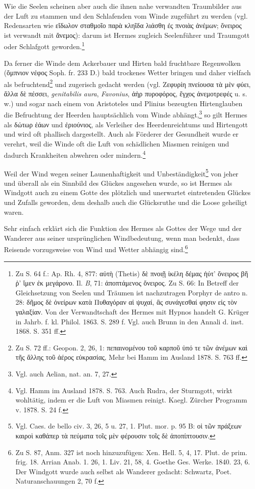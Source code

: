 \documentclass[a4paper, 11pt, oneside]{article}
\begin{document}
Wie die Seelen scheinen aber auch die ihnen nahe verwandten Traumbilder aus der Luft zu stammen und den Schlafenden vom Winde zugeführt zu werden (vgl. Redensarten wie εἴδωλον σταθμοῖο παρὰ κληῖδα λιάσθη ἐς πνοιὰς ἀνέμων; ὄνειρος ist verwandt mit ἄνεμος): darum ist Hermes zugleich Seelenführer und Traumgott oder Schlafgott geworden.\footnote{Zu S. 64 f.: Ap. Rh. 4, 877: αὐτὴ (Thetis) δὲ πνοιῇ ἰκέλη δέμας ἠύτ' ὄνειρος βῆ ῥ' ἵμεν ἐκ μεγάρονο. Il. \emph{B}, 71: ἀποπτάμενος ὄνειρος. Zu S. 66: In Betreff der Gleichsetzung von Seelen und Träumen ist nachzutragen Porphyr de antro n. 28: δῆμος δὲ ὀνείρων κατὰ Πυθαγόραν αἱ ψυχαί, ἃς συνάγεσθαί φησιν εἰς τὸν γαλαξίαν. Von der Verwandtschaft des Hermes mit Hypnos handelt G. Krüger in Jahrb. f. kl. Philol. 1863. S. 289 f. Vgl. auch Brunn in den Annali d. inst. 1868. S. 351 ff.}

Da ferner die Winde dem Ackerbauer und Hirten bald fruchtbare Regenwolken (ὄμπνιον νέφος Soph. fr. 233 D.) bald trockenes Wetter bringen und daher vielfach als befruchtend\footnote{Zu S. 72 ff.: Geopon. 2, 26, 1: πεπαινομένου τοῦ καρποῦ ὑπό τε τῶν ἀνέμων καὶ τῆς ἄλλης τοῦ ἀέρος εὐκρασίας, Mehr bei Hamm im Ausland 1878. S. 763 ff.} und zugerisch gedacht werden (vgl. Ζεφυρίη πνείουσα τὰ μὲν φύει, ἄλλα δὲ πέσσει, \emph{genitabilis aura}, \emph{Favonius}, ἀὴρ πυροφόρος, ἔγχος ἀνεμοτρεφές u. s. w.) und sogar nach einem von Aristoteles und Plinius bezeugten Hirtenglauben die Befruchtung der Heerden hauptsächlich vom Winde abhängt,\footnote{Vgl. auch Aelian, nat. an. 7, 27.} so gilt Hermes als δώτωρ ἐάων und ἐριούνιος, als Verleiher des Heerdenreichtums und Hirtengott und wird oft phallisch dargestellt. Auch als Förderer der Gesundheit wurde er verehrt, weil die Winde oft die Luft von schädlichen Miasmen reinigen und dadurch Krankheiten abwehren oder mindern.\footnote{Vgl. Hamm im Ausland 1878. S. 763. Auch Rudra, der Sturmgott, wirkt wohltätig, indem er die Luft von Miasmen reinigt. Kaegl. Zürcher Programm v. 1878. S. 24 f.}

Weil der Wind wegen seiner Launenhaftigkeit und Unbeständigkeit\footnote{Vgl. Caes. de bello civ. 3, 26, 5 u. 27, 1. Plut. mor. p. 95 B: οἱ τῶν πράξεων καιροὶ καθάπερ τὰ πεύματα τοῖς μὲν φέρουσιν τοῖς δὲ ἀποπίπτουσιν.} von jeher und überall als ein Sinnbild des Glückes angesehen wurde, so ist Hermes als Windgott auch zu einem Gotte des plötzlich und unerwartet eintretenden Glückes und Zufalls geworden, dem deshalb auch die Glücksruthe und die Loose geheiligt waren.

Sehr einfach erklärt sich die Funktion des Hermes als Gottes der Wege und der Wanderer aus seiner ursprünglichen Windbedeutung, wenn man bedenkt, dass Reisende vorzugsweise von Wind und Wetter abhängig sind.\footnote{Zu S. 87, Anm. 327 ist noch hinzuzufügen: Xen. Hell. 5, 4, 17. Plut. de prim. frig. 18. Arrian Anab. 1. 26, 1. Liv. 21, 58, 4. Goethe Ges. Werke. 1840. 23, 6. Der Windgott wurde auch selbst als Wanderer gedacht: Schwartz, Poet. Naturanschauungen 2, 70 f.}
\end{document}
